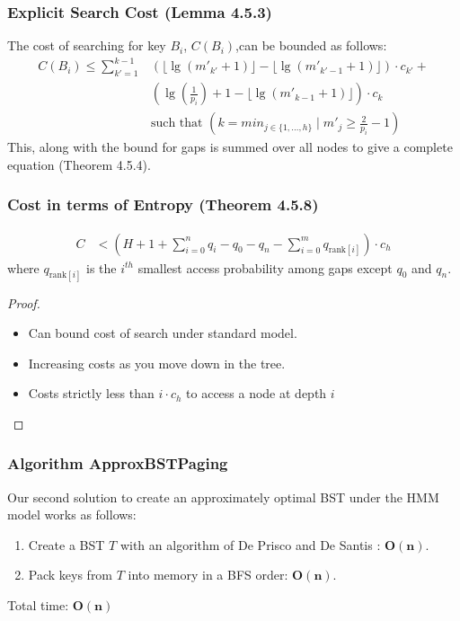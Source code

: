 \documentclass[]{beamer}
\theoremstyle{plain}
\begin{document}
\begin{frame}\frametitle{Explicit Search Cost (Lemma 4.5.3)}
The cost of searching for key $B_i$, $C(B_i)$,can be bounded as follows: 
\begin{align*} 
C(B_i) \leq  \sum_{k'=1}^{k-1} &\left(\lfloor \lg(m'_{k'}+1) \rfloor - \lfloor \lg(m'_{k'-1}+1) \rfloor \right)\cdot c_{k'} + \\
 &\left(\lg(\frac{1}{p_i}) + 1 - \lfloor \lg(m'_{k-1}+1) \rfloor \right)\cdot c_k \\
&\text{such that } \left( k=min_{j \in \{1, ..., h\}} \mid m'_j \geq \frac{2}{p_i}-1 \right) 
\end{align*}
This, along with the bound for gaps is summed over all nodes to give a complete equation (Theorem 4.5.4).
\end{frame}

\begin{frame}\frametitle{Cost in terms of Entropy (Theorem 4.5.8)}
\begin{align*}
C &< \left(H + 1 + \sum_{i=0}^n q_i - q_0 - q_n - \sum_{i=0}^m q_{\text{rank}[i]} \right) \cdot  c_h
\end{align*}
where $q_{\text{rank}[i]}$ is the $i^{th}$ smallest access probability among gaps except $q_0$ and $q_n$.
\begin{proof}
\begin{itemize}
\item Can bound cost of search under standard model.
\item Increasing costs as you move down in the tree.
\item Costs strictly less than $i \cdot c_h$ to access a node at depth $i$
\end{itemize}
\end{proof}
\end{frame}


\begin{frame} \frametitle{Algorithm ApproxBSTPaging}
Our second solution to create an approximately optimal BST under the HMM model works as follows: \\

\begin{enumerate}
\item Create a BST $T$ with an algorithm of De Prisco and De Santis \cite{de1993binary}: \textbf{$\mathbf{O(n)}$}. \\

\item Pack keys from $T$ into memory in a BFS order: \textbf{$\mathbf{O(n)}$}.
\end{enumerate}

Total time: $\mathbf{O(n)}$
\end{frame}
\end{document}
